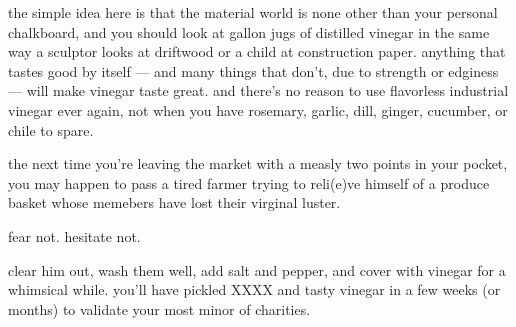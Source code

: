 the simple idea here is that the material world is none other than
your personal chalkboard, and you should look at gallon jugs of
distilled vinegar in the same way a sculptor looks at driftwood or a
child at construction paper. anything that tastes good by itself ---
and many things that don't, due to strength or edginess --- will make
vinegar taste great. and there's no reason to use flavorless
industrial vinegar ever again, not when you have rosemary, garlic,
dill, ginger, cucumber, or chile to spare.

the next time you're leaving the market with a measly two points in
your pocket, you may happen to pass a tired farmer trying to reli(e)ve
himself of a produce basket whose memebers have lost their virginal
luster.

\hskip2cm fear not. hesitate not.

clear him out, wash them well, add salt and pepper, and cover with
vinegar for a whimsical while. you'll have pickled XXXX and tasty
vinegar in a few weeks (or months) to validate your most minor of
charities.
